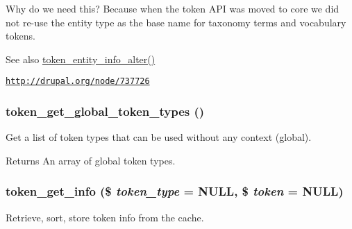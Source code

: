 Why do we need this? Because when the token API was moved to core we did not re-\/use the entity type as the base name for taxonomy terms and vocabulary tokens.

\begin{DoxySeeAlso}{See also}
\hyperlink{token_8module_a9015db039cba923ed4bb1167faa8a4a8}{token\_\-entity\_\-info\_\-alter()} 

\href{http://drupal.org/node/737726}{\tt http://drupal.org/node/737726} 
\end{DoxySeeAlso}
\hypertarget{token_8module_ac36628cb3e63ce348391ca7ec9c628a1}{
\subsubsection[{token\_\-get\_\-global\_\-token\_\-types}]{\setlength{\rightskip}{0pt plus 5cm}token\_\-get\_\-global\_\-token\_\-types ()}}
\label{token_8module_ac36628cb3e63ce348391ca7ec9c628a1}
Get a list of token types that can be used without any context (global).

\begin{DoxyReturn}{Returns}
An array of global token types. 
\end{DoxyReturn}
\hypertarget{token_8module_a5f133651e755907cb560b5860d44d2c2}{
\subsubsection[{token\_\-get\_\-info}]{\setlength{\rightskip}{0pt plus 5cm}token\_\-get\_\-info (\$ {\em token\_\-type} = {\ttfamily NULL}, \/  \$ {\em token} = {\ttfamily NULL})}}
\label{token_8module_a5f133651e755907cb560b5860d44d2c2}
Retrieve, sort, store token info from the cache.


